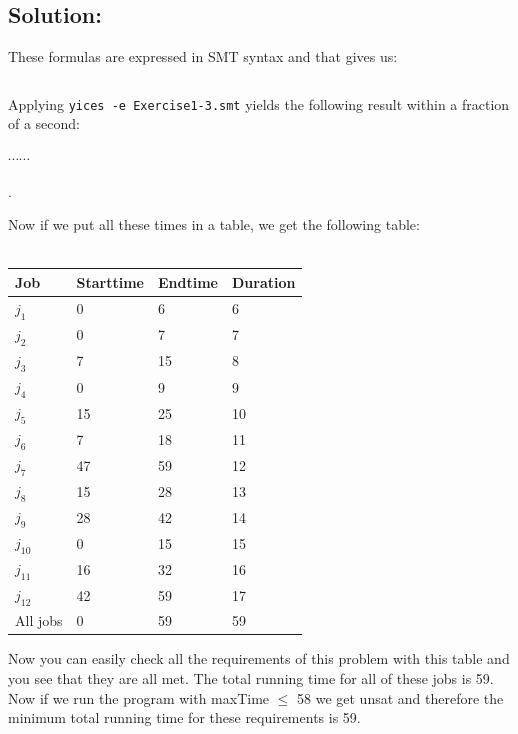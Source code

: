 \documentclass[12pt]{article}
\begin{document}
\subsection*{Solution:}


\noindent These formulas are expressed in SMT syntax and that gives us:

{\footnotesize
\begin{verbatim}

\end{verbatim}
}

\noindent Applying {\tt yices -e Exercise1-3.smt} yields the following result
within a fraction of a second:

{\footnotesize



$\cdots \cdots$ }.

\noindent Now if we put all these times in a table, we get the following table:\\
\\
\begin{tabular}{| l | l | l | l |}
\hline
Job	& Starttime	& Endtime	& Duration\\
\hline
$j_1$	& 0	&	6	&	6\\
$j_2$	& 0	&	7	&	7\\
$j_3$	& 7	&	15	&	8\\
$j_4$	& 0	&	9	&	9\\
$j_5$	& 15	&	25	&	10\\
$j_6$	& 7	&	18	&	11\\
$j_7$	& 47	&	59	&	12\\
$j_8$	& 15	&	28	&	13\\
$j_9$	& 28	&	42	&	14\\
$j_{10}$	& 0	&	15	&	15\\
$j_{11}$	& 16	&	32	&	16\\
$j_{12}$	& 42	&	59	&	17\\
\hline
All jobs	&	0	&	59	&	59\\
\hline
\end{tabular}

\vspace{3mm}

Now you can easily check all the requirements of this problem with this table and you see that they are all met. The total running time for all of these jobs is 59. Now if we run the program with maxTime $\leq$ 58 we get unsat and therefore the minimum total running time for these requirements is 59.

\vspace{3mm}
\end{document}
